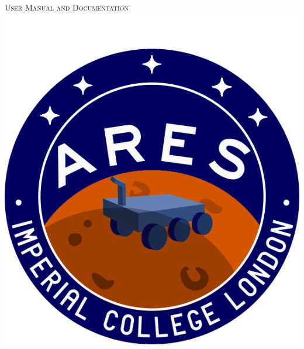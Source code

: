 \begin{titlepage}
     \textsc{\Large User Manual and Documentation}\\[0.5cm]
    \includegraphics[scale=0.5]{./Figures/ARESLOGO.png}\\[1cm]
    
    
    
    
    

\end{titlepage}
